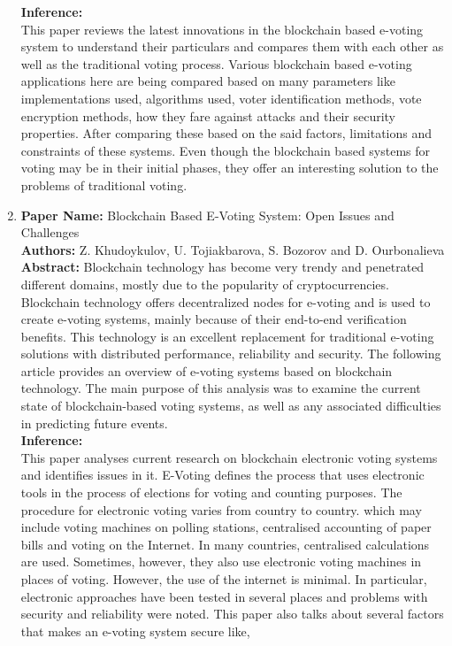 \documentclass[oneside, 12pt]{book}
\begin{document}
\begin{enumerate}
					\textbf{Inference:}
					\\This paper reviews the latest innovations in the  blockchain based e-voting system to understand their particulars and compares them with each other as well as the traditional voting process. Various blockchain based e-voting applications here are being compared based on many parameters like  implementations used, algorithms used, voter identification methods, vote encryption methods, how they fare against attacks and their security properties. After comparing these based on the said factors, limitations and constraints of these systems. Even though the blockchain based systems for voting may be in their initial phases, they offer an interesting solution to the problems of traditional voting.
				\item
					\textbf{Paper Name:} Blockchain Based E-Voting System: Open Issues and Challenges \cite{khudoykulov2021blockchain}\\
					\textbf{Authors:} Z. Khudoykulov, U. Tojiakbarova, S. Bozorov and D. Ourbonalieva\\
					\textbf{Abstract:} Blockchain technology has become very trendy and penetrated different domains, mostly due to the popularity of cryptocurrencies. Blockchain technology offers decentralized nodes for e-voting and is used to create e-voting systems, mainly because of their end-to-end verification benefits. This technology is an excellent replacement for traditional e-voting solutions with distributed performance, reliability and security. The following article provides an overview of e-voting systems based on blockchain technology. The main purpose of this analysis was to examine the current state of blockchain-based voting systems, as well as any associated difficulties in predicting future events.\\
					\textbf{Inference:}
					\\This paper analyses current research on blockchain electronic voting systems and identifies issues in it. E-Voting defines the process that uses electronic tools in the process of elections for voting and counting purposes. The procedure for electronic voting varies from country to country. which may include voting machines on polling stations, centralised accounting of paper bills and voting on the Internet. In many countries, centralised calculations are used. Sometimes, however, they also use electronic voting machines in places of voting. However, the use of the internet is minimal. In particular, electronic approaches have been tested in several places and problems with security and reliability were noted. This paper also talks about several factors that makes an e-voting system secure like,

\end{enumerate}
\end{document}
